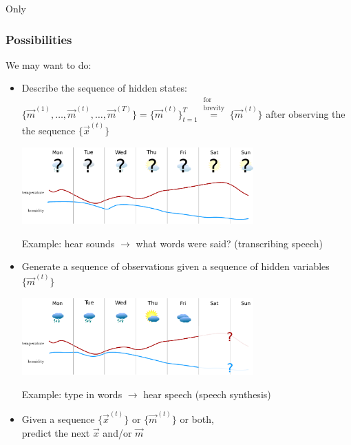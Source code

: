 \begin{frame}{Only}
\frametitle{Possibilities}

We may want to do:
\begin{itemize}
\item<only@1> Describe the sequence of hidden states:
$\{ \vec m^{(1)}, \ldots, \vec m^{(t)}, \ldots, \vec m^{(T)}\} = \{ \vec m^{(t)}\}_{t=1}^{T} \stackrel{\substack{\text{for}\\ \text{brevity}}}{=} \{ \vec m^{(t)}\}$
after observing the the sequence $\{\vec x^{(t)}\}$\\

\svspace{5mm}

\begin{center}
	\includegraphics[width=0.7\textwidth]{img/weather_est_states}
\end{center}

Example: hear sounds $\rightarrow$ what words were said? (transcribing speech)
\item<only@2> Generate a sequence of observations given a sequence of hidden variables $\{\vec m^{(t)}\}$
\\

\svspace{5mm}

\begin{center}
	\includegraphics[width=0.7\textwidth]{img/weather_est_obs}
\end{center}

Example: type in words $\rightarrow$ hear speech (speech synthesis)
\item<only@3> Given a sequence $\{\vec x^{(t)}\}$ or $\{\vec m^{(t)}\}$ or both,\\
predict the next $\vec x$ and/or $\vec m$


\end{itemize}
\end{frame}
